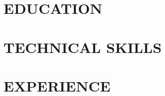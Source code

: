 \documentclass{res}
\begin{document}


\begin{resume}

\section{EDUCATION}

\section{TECHNICAL SKILLS}


\section{EXPERIENCE}




\end{resume}
\end{document}

